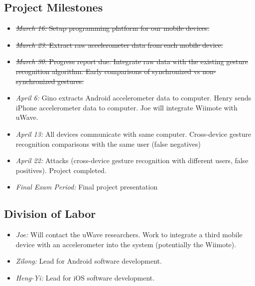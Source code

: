 
\subsection{Project Milestones}
\label{sec:Milestones}

\begin{itemize}
\item \sout{\emph{March 16:} Setup programming platform for our mobile devices. }
\item \sout{\emph{March 23:} Extract raw accelerometer data from each mobile device.}
\item \sout{\emph{March 30:} Progress report due. Integrate raw data with the existing gesture recognition algorithm. Early comparisons of synchronized vs non-synchronized gestures.}
\item \emph{April 6:} Gino extracts Android accelerometer data to computer. Henry sends iPhone accelerometer data to computer. Joe will integrate Wiimote with uWave.  
\item \emph{April 13:} All devices communicate with same computer. Cross-device gesture recognition comparisons with the same user (false negatives)
\item \emph{April 22:} Attacks (cross-device gesture recognition with different users, false positives). Project completed. 
\item \emph{Final Exam Period:} Final project presentation
\end{itemize}

\subsection{Division of Labor}

\begin{itemize}
\item \emph{Joe:} Will contact the uWave researchers. Work to integrate a third mobile device with an accelerometer into the system (potentially the Wiimote).
\item \emph{Zilong:} Lead for Android software development. 
\item \emph{Heng-Yi:} Lead for iOS software development. 
\end{itemize}


